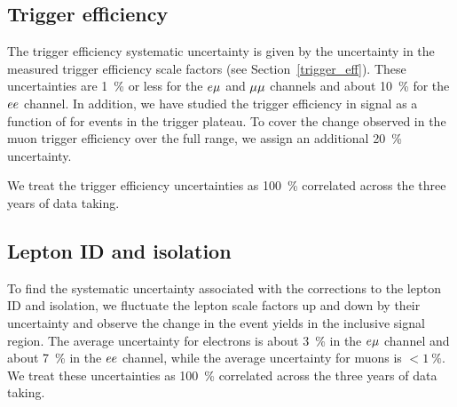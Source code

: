 \subsection{Trigger efficiency}
The trigger efficiency systematic uncertainty is given by the uncertainty in the measured trigger efficiency scale factors (see Section~\ref{trigger_eff}). These uncertainties are \SI{1}{\percent} or less for the $e{\mu}$ and ${\mu}{\mu}$ channels and about \SI{10}{\percent} for the $ee$ channel. In addition, we have studied the trigger efficiency in signal as a function of \ad{} for events in the trigger \pt plateau. To cover the change observed in the muon trigger efficiency over the full \ad range, we assign an additional \SI{20}{\percent} uncertainty.

We treat the trigger efficiency uncertainties as \SI{100}{\percent} correlated across the three years of data taking.

%

\subsection{Lepton ID and isolation}
To find the systematic uncertainty associated with the corrections to the lepton ID and isolation, we fluctuate the lepton scale factors up and down by their uncertainty and observe the change in the event yields in the inclusive signal region. The average uncertainty for electrons is about \SI{3}{\percent} in the $e{\mu}$ channel and about \SI{7}{\percent} in the $ee$ channel, while the average uncertainty for muons is $< \SI{1}{\percent}$. We treat these uncertainties as \SI{100}{\percent} correlated across the three years of data taking.

